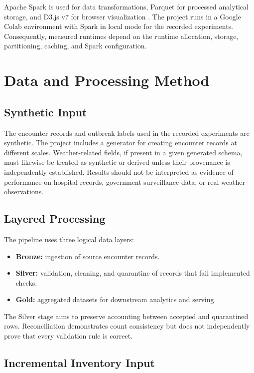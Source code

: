 ﻿\documentclass[conference]{IEEEtran}
\begin{document}
Apache Spark is used for data transformations, Parquet for processed analytical storage, and D3.js v7 for browser visualization \cite{spark,parquet,d3}. The project runs in a Google Colab environment with Spark in local mode for the recorded experiments. Consequently, measured runtimes depend on the runtime allocation, storage, partitioning, caching, and Spark configuration.

\section{Data and Processing Method}

\subsection{Synthetic Input}

The encounter records and outbreak labels used in the recorded experiments are synthetic. The project includes a generator for creating encounter records at different scales. Weather-related fields, if present in a given generated schema, must likewise be treated as synthetic or derived unless their provenance is independently established. Results should not be interpreted as evidence of performance on hospital records, government surveillance data, or real weather observations.

\subsection{Layered Processing}

The pipeline uses three logical data layers:
\begin{itemize}
    \item \textbf{Bronze:} ingestion of source encounter records.
    \item \textbf{Silver:} validation, cleaning, and quarantine of records that fail implemented checks.
    \item \textbf{Gold:} aggregated datasets for downstream analytics and serving.
\end{itemize}

The Silver stage aims to preserve accounting between accepted and quarantined rows. Reconciliation demonstrates count consistency but does not independently prove that every validation rule is correct.

\subsection{Incremental Inventory Input}
\end{document}
